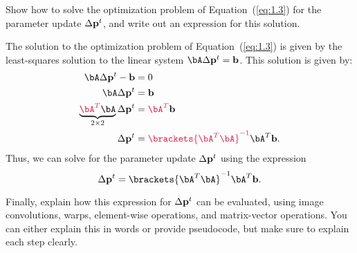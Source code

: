 \begin{problem}
\begin{enumroman}
    \item Show how to solve the optimization problem of Equation~(\ref{eq:1.3})
      for the parameter update $\Delta \mathbf{p}^t$, and write out an expression
      for this solution.

      \begin{answer}
        The solution to the optimization problem of Equation~(\ref{eq:1.3})
        is given by the least-squares solution to the linear system
        $\bA \Delta \bp^t = \bb$. This solution is given by:
        \begin{align*}
          \bA \Delta \bp^t - \bb &= 0 \\
          \bA \Delta \bp^t &= \bb \\
          \underbrace{\crim{\bA^T} \bA}_{2 \times 2} \Delta \bp^t &= \crim{\bA^T} \bb \\
          \Delta \bp^t &= \crim{\brackets{\bA^T \bA}^{-1}} \bA^T \bb.
        \end{align*}
        Thus, we can solve for the parameter update $\Delta \mathbf{p}^t$ using the expression
        \begin{equation}
          \Delta \bp^t = \brackets{\bA^T \bA}^{-1} \bA^T \bb.
          \label{eq:ans:1.3}
        \end{equation}
      \end{answer}

    \newpage
    \item Finally, explain how this expression for $\Delta \mathbf{p}^t$ can be
      evaluated, using image convolutions, warps, element-wise operations,
      and matrix-vector operations. You can either explain this in words
      or provide pseudocode, but make sure to explain each step clearly.


\end{enumroman}
\end{problem}
